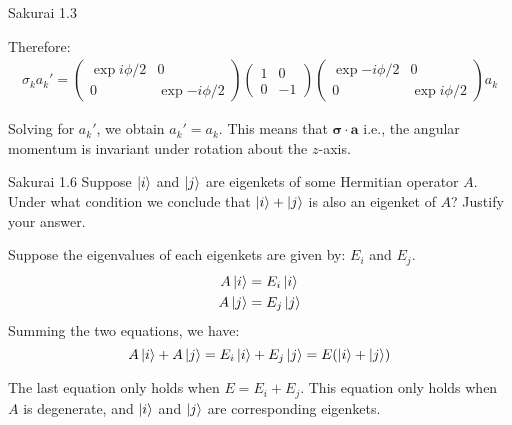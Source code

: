 \documentclass{article}
\begin{document}
\begin{section}{Sakurai 1.3}
\begin{tcolorbox}[breakable]
		Therefore:
		\begin{align*}
			\sigma_k a_k' = 
			\begin{pmatrix}
				\exp{i \phi / 2} & 0 \\
				0 & \exp{-i \phi / 2}
			\end{pmatrix}
			\begin{pmatrix}1 & 0 \\ 0 & -1 \end{pmatrix}
			\begin{pmatrix}
				\exp{-i \phi / 2} & 0 \\
				0 & \exp{i \phi / 2} 
			\end{pmatrix}
			a_k
		\end{align*}

		Solving for $a_k'$, we obtain $a_k' = a_k$. This means that $\boldsymbol{\sigma \cdot a}$  i.e., the angular momentum is invariant under rotation about the $z$-axis.
		\end{tcolorbox}
	\end{section}

	\newpage
	\begin{section}{Sakurai 1.6}
		Suppose $\ket{i}$ and $\ket{j}$ are eigenkets of some Hermitian operator $A$. Under what condition we conclude that $\ket{i} + \ket{j}$ is also an eigenket of $A$? Justify your answer.
		
		\begin{tcolorbox}
			Suppose the eigenvalues of each eigenkets are given by: $E_i$ and $E_j$. \begin{align*}
				A \ket{i} &= E_i \ket{i} \\
				A \ket{j} &= E_j \ket{j}
			\end{align*}
			Summing the two equations, we have:
			\begin{equation*}
				A \ket{i} + A \ket{j} = E_i \ket{i} + E_j \ket{j} = E (\ket{i} + \ket{j})
			\end{equation*}

			The last equation only holds when $E = E_i + E_j$. This equation only holds when $A$ is degenerate, and $\ket{i}$ and $\ket{j}$ are corresponding eigenkets.
		\end{tcolorbox}
	\end{section}
\end{document}
